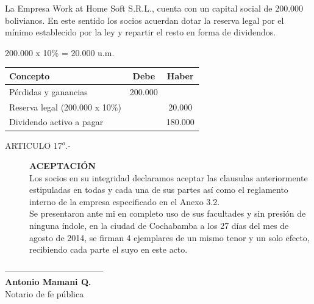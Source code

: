 \documentclass[11pt,letterpaper]{report}
\begin{document}
La Empresa Work at Home Soft S.R.L., cuenta con un capital social de 200.000 bolivianos.
En este sentido los socios acuerdan dotar la reserva legal por el m\'inimo establecido por la ley y repartir el resto en forma de dividendos.
\begin{center}
200.000 x 10\% = 20.000 u.m.
\end{center}
\begin{center}


\begin{tabular}{l|c|c}
Concepto & Debe & Haber\\\hline
P\'erdidas y ganancias & 200.000 & \\
Reserva legal (200.000 x 10\%) & ~ & 20.000\\
Dividendo activo a pagar & ~ & 180.000
\end{tabular}
\end{center}
\begin{description}
\item[ARTICULO 17$^{o}$.-]{\bf ACEPTACI\'ON}\\
Los socios en su integridad declaramos aceptar las clausulas anteriormente estipuladas en todas y cada una de sus partes as\'i como el reglamento interno de la empresa especificado en el Anexo 3.2.\\
Se presentaron ante mi en completo uso de sus facultades y sin presi\'on de ninguna \'indole, en la ciudad de Cochabamba a los 27 d\'ias del mes de agosto de 2014, se firman 4 ejemplares de un mismo tenor y un solo efecto, recibiendo cada parte el suyo en este acto.
\end{description}





\vspace{6em}


\begin{center}
-----------------------------------\\
{\bf Antonio Mamani Q.}\\
Notario de fe p\'ublica\\
\end{center}
~\\\vspace{4em}
\end{document}

